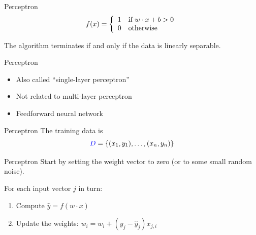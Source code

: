 \begin{frame}{Perceptron}
  \begin{displaymath}
    f(x) = \left\{
      \begin{array}{l l}
        1 & \mbox{if } w\cdot x + b > 0 \\
        0 & \mbox{otherwise}
      \end{array}
      \right.
    \end{displaymath}

    The algorithm terminates if and only if the data is linearly
    separable.
\end{frame}

\begin{frame}{Perceptron}
  \begin{itemize}
  \item Also called ``single-layer perceptron''
  \item Not related to multi-layer perceptron
  \item Feedforward neural network
  \end{itemize}
\end{frame}

\begin{frame}{Perceptron}
  The training data is
  \begin{displaymath}
    \textcolor{blue}{D} = \{(x_1, y_1), \ldots, (x_n, y_n)\}
  \end{displaymath}

\end{frame}

\begin{frame}{Perceptron}
  Start by setting the weight vector to zero (or to some small random noise).

  \vspace{5mm}
  For each input vector $j$ in turn:
  \begin{enumerate}
  \item Compute $\hat{y} = f(w\cdot x)$
  \item Update the weights: $w_{i} = w_{i} + (y_j - \hat{y}_j) x_{j,i}$
  \end{enumerate}
\end{frame}

